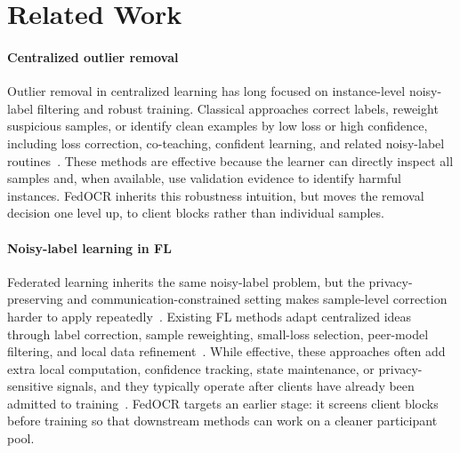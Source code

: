 ﻿\documentclass[conference]{IEEEtran}
\theoremstyle{definition}
\theoremstyle{remark}
\begin{document}
\section{Related Work}

\paragraph{\textbf{Centralized outlier removal}}
Outlier removal in centralized learning has long focused on instance-level noisy-label filtering and robust training.
Classical approaches correct labels, reweight suspicious samples, or identify clean examples by low loss or high confidence, including loss correction, co-teaching, confident learning, and related noisy-label routines~\cite{natarajan2013noisy,patrini2017loss,han2018coteaching,zhang2021nochange,northcutt2021confident}.
These methods are effective because the learner can directly inspect all samples and, when available, use validation evidence to identify harmful instances.
FedOCR inherits this robustness intuition, but moves the removal decision one level up, to client blocks rather than individual samples.

\paragraph{\textbf{Noisy-label learning in FL}}
Federated learning inherits the same noisy-label problem, but the privacy-preserving and communication-constrained setting makes sample-level correction harder to apply repeatedly~\cite{li2020fedprox,karimireddy2020scaffold,khaled2020convergence,liang2023fednoisy}.
Existing FL methods adapt centralized ideas through label correction, sample reweighting, small-loss selection, peer-model filtering, and local data refinement~\cite{tsouvalas2024labeling,xu2022fedcorr,wu2023fednoro,li2024feddiv,ji2024fedfixer,hao2025fedcs,sivasubramanian2024gradient}.
While effective, these approaches often add extra local computation, confidence tracking, state maintenance, or privacy-sensitive signals, and they typically operate after clients have already been admitted to training~\cite{kairouz2021advances,xu2022fedcorr,hao2025fedcs}.
FedOCR targets an earlier stage: it screens client blocks before training so that downstream methods can work on a cleaner participant pool.
\end{document}
